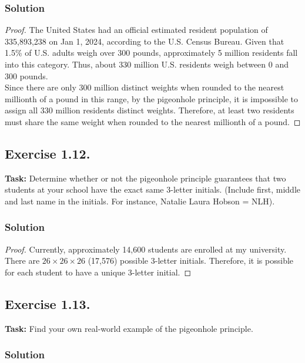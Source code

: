 \documentclass{article}
\begin{document}
\subsubsection*{Solution}

\begin{proof}
The United States had an official estimated resident population of \\335,893,238 on Jan 1, 2024, according to the U.S. Census Bureau. Given that 1.5\% of U.S. adults weigh over 300 pounds, approximately 5 million residents fall into this category. Thus, about 330 million U.S. residents weigh between 0 and 300 pounds. \\
Since there are only 300 million distinct weights when rounded to the nearest millionth of a pound in this range, by the pigeonhole principle, it is impossible to assign all 330 million residents distinct weights. Therefore, at least two residents must share the same weight when rounded to the nearest millionth of a pound. 
\end{proof}

\subsection{Exercise 1.12.}
\textbf{Task:} Determine whether or not the pigeonhole principle guarantees that two students at your school have the exact same 3-letter initials. (Include first, middle and last name in the initials. For instance, Natalie Laura Hobson = NLH).

\subsubsection*{Solution}

\begin{proof}
Currently, approximately 14,600 students are enrolled at my university. There are $26 \times 26 \times 26$ (17,576) possible 3-letter initials. Therefore, it is possible for each student to have a unique 3-letter initial.
\end{proof}

\newpage 

\subsection{Exercise 1.13.}
\textbf{Task:} Find your own real-world example of the pigeonhole principle.

\subsubsection*{Solution}
\end{document}
